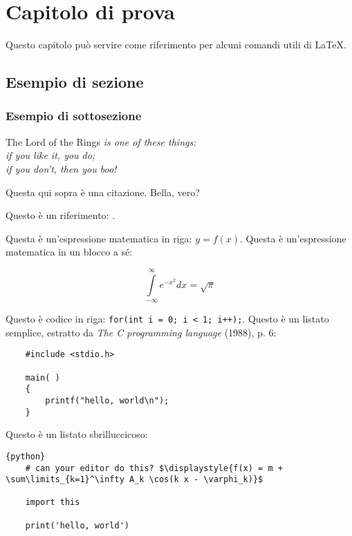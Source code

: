 \chapter{Capitolo di prova}

Questo capitolo può servire come riferimento per alcuni comandi utili di \LaTeX.

\section{Esempio di sezione}

\subsection{Esempio di sottosezione}

\begin{displayquote}[J. R. R. Tolkien]
	The Lord of the Rings \textit{is one of these things: \\ if you like it, you do; \\ if you don't, then you boo!}
\end{displayquote}

Questa qui sopra è una citazione. Bella, vero?

Questo è un riferimento: \cite{lamport1986latex}.

Questa è un'espressione matematica in riga: $y = f(x)$. Questa è un'espressione matematica in un blocco a sé:

\begin{equation}
	\int\limits_{-\infty}^\infty e^{-x^2}dx = \sqrt{\pi}
\end{equation}

Questo è codice in riga: \verb|for(int i = 0; i < 1; i++);|. Questo è un listato semplice, estratto da \textit{The C programming language} (1988), p. 6:

\begin{verbatim}
    #include <stdio.h>

    main( )
    {
        printf("hello, world\n");
    }
\end{verbatim}

Questo è un listato sbrilluccicoso:

\begin{lstlisting}[mathescape,gobble=2]{python}
    # can your editor do this? $\displaystyle{f(x) = m + \sum\limits_{k=1}^\infty A_k \cos(k x - \varphi_k)}$

    import this

    print('hello, world')
\end{lstlisting}
